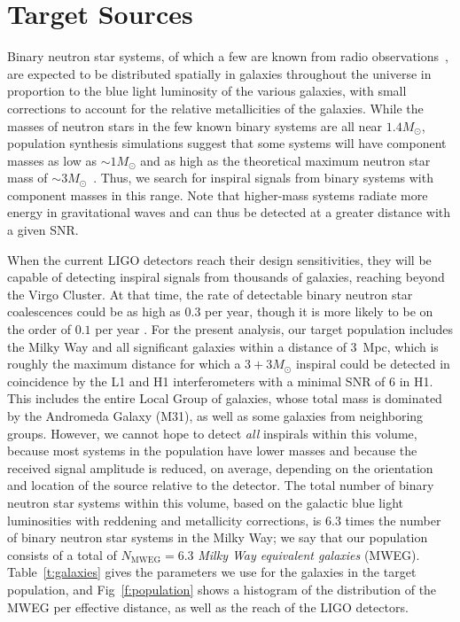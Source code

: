 
\section{Target Sources}

Binary neutron star systems, of which a few are known from radio
observations~\cite{Stairs:2004}, are
expected to be distributed spatially in galaxies throughout the universe in
proportion to the blue light luminosity of the various galaxies, with small
corrections to account for the relative metallicities of the galaxies.
While the masses of neutron stars in the few known binary systems are all
near $1.4 M_\odot$, population synthesis simulations suggest that some
systems will have component masses as low as $\sim 1 M_\odot$ and as
high as the theoretical maximum neutron star mass of $\sim 3
M_\odot$~\cite{Belczynski:2002}.  Thus, we search for inspiral signals
from binary systems with component masses in this range.  Note that
higher-mass systems radiate more energy in gravitational waves and can
thus be detected at a greater distance with a given SNR.

When the current LIGO detectors reach their design sensitivities, they
will be capable of detecting inspiral signals from thousands of
galaxies, reaching beyond the Virgo Cluster.  At that time, the
rate of detectable binary neutron star coalescences could be as high
as $0.3$ per year, though it is more likely to be on the order of
$0.1$ per year \cite{Kalogera:2004tn}.
%
For the present analysis, our target population includes the Milky Way
and all significant galaxies within a distance of 3~Mpc,
which is roughly the maximum distance for which a $3 + 3 M_\odot$
inspiral could be detected in coincidence by the L1 and H1
interferometers with a minimal SNR of 6 in H1.  This includes the
entire Local Group of galaxies, whose total mass is dominated by the
Andromeda Galaxy (M31), as well as some galaxies from neighboring
groups.  However, we cannot hope to detect {\em all} inspirals within
this volume, because most systems in the population have lower masses
and because the received signal amplitude is reduced, on average,
depending on the orientation and location of the source relative to
the detector.
%
The total number of binary neutron star
systems within this volume, based on the galactic blue light luminosities
with reddening and metallicity corrections,
is 6.3 times the number of binary neutron star
systems in the Milky Way; we say that our population consists of a total of
$N_{\text{MWEG}}=6.3$ \emph{Milky Way equivalent galaxies} (MWEG).
Table~\ref{t:galaxies} gives the parameters we use for the galaxies in
the target population, and Fig~\ref{f:population} shows a histogram 
of the distribution of the MWEG per effective distance, as well as the reach of 
the LIGO detectors. 

